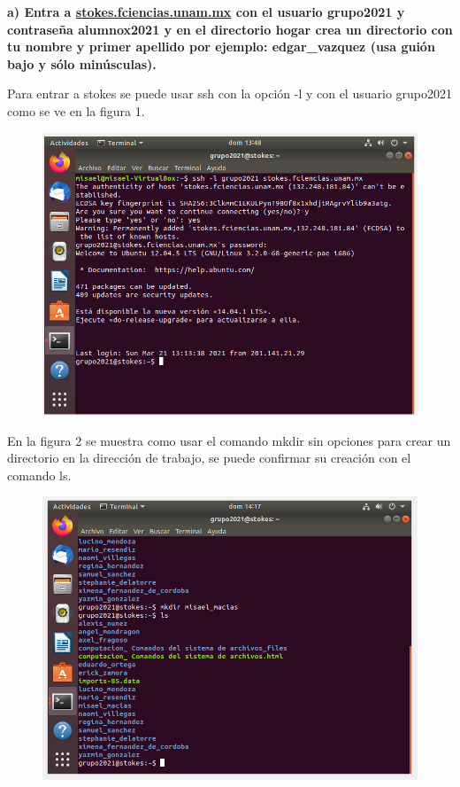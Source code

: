 \documentclass[12pt,a4paper]{article}
\begin{document}
\noindent \textbf{a) Entra a \underline{stokes.fciencias.unam.mx} con el usuario grupo2021 y contraseña alumnox2021 y en el directorio hogar crea un directorio con tu nombre y primer apellido por ejemplo:
edgar\_vazquez (usa guión bajo y sólo minúsculas).}

\noindent Para entrar a stokes se puede usar ssh con la opción -l y con el usuario grupo2021 como se ve en la figura 1.

\begin{figure}[h!]
    \centering
    \includegraphics[scale = 0.5]{a.1.png}
    \caption{}
\end{figure}

\noindent En la figura 2 se muestra como usar el comando mkdir sin opciones para crear un directorio en la dirección de trabajo, se puede confirmar su creación con el comando ls.
\begin{figure}[h!]
    \centering
    \includegraphics[scale = 0.5]{a.2.png}
    \caption{}
\end{figure}
\newpage
\end{document}
